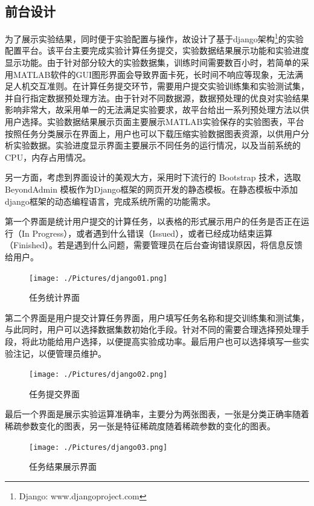 \documentclass[oneside]{ZJUthesis}
\begin{document}
\subsection{前台设计}
为了展示实验结果，同时便于实验配置与操作，故设计了基于django架构\footnote{Django: www.djangoproject.com}的实验配置平台。该平台主要完成实验计算任务提交，实验数据结果展示功能和实验进度显示功能。由于针对部分较大的实验数据集，训练时间需要数百小时，若简单的采用MATLAB软件的GUI图形界面会导致界面卡死，长时间不响应等现象，无法满足人机交互准则。在计算任务提交环节，需要用户提交实验训练集和实验测试集，并自行指定数据预处理方法。由于针对不同数据源，数据预处理的优良对实验结果影响非常大，故采用单一的无法满足实验要求，故平台给出一系列预处理方法以供用户选择。实验数据结果展示页面主要展示MATLAB实验保存的实验图表，平台按照任务分类展示在界面上，用户也可以下载压缩实验数据图表资源，以供用户分析实验数据。实验进度显示界面主要展示不同任务的运行情况，以及当前系统的CPU，内存占用情况。

另一方面，考虑到界面设计的美观大方，采用时下流行的 Bootstrap 技术，选取 BeyondAdmin 模板作为Django框架的网页开发的静态模板。在静态模板中添加django框架的动态编程语言，完成系统所需的功能需求。

第一个界面是统计用户提交的计算任务，以表格的形式展示用户的任务是否正在运行（In Progress），或者遇到什么错误（Issued），或者已经成功结束运算（Finished）。若是遇到什么问题，需要管理员在后台查询错误原因，将信息反馈给用户。
\begin{figure}[h]
\centering
\texttt{[image: ./Pictures/django01.png]}
\caption{任务统计界面\label{fig:framework}}
\end{figure}

第二个界面是用户提交计算任务界面，用户填写任务名称和提交训练集和测试集，与此同时，用户可以选择数据集数初始化手段。针对不同的需要合理选择预处理手段，将此功能给用户选择，以便提高实验成功率。最后用户也可以选择填写一些实验注记，以便管理员维护。
\begin{figure}[h]
\centering
\texttt{[image: ./Pictures/django02.png]}
\caption{任务提交界面\label{fig:framework}}
\end{figure}

最后一个界面是展示实验运算准确率，主要分为两张图表，一张是分类正确率随着稀疏参数变化的图表，另一张是特征稀疏度随着稀疏参数的变化的图表。
\begin{figure}[h]
\centering
\texttt{[image: ./Pictures/django03.png]}
\caption{任务结果展示界面\label{fig:framework}}
\end{figure}
\end{document}
